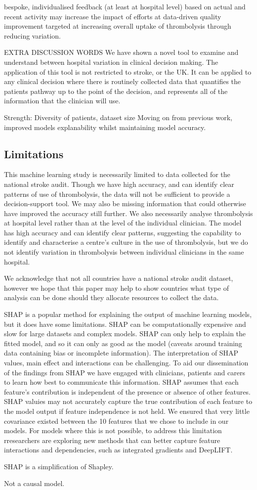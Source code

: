 bespoke, individualised feedback (at least at hospital level) based on actual and recent activity may increase the impact of efforts at data-driven quality improvement targeted at increasing overall uptake of thrombolysis through reducing variation.

EXTRA DISCUSSION WORDS
We have shown a novel tool to examine and understand between hospital variation in clinical decision making. The application of this tool is not restricted to stroke, or the UK. It can be applied to any clinical decision where there is routinely collected data that quantifies the patients pathway up to the point of the decision, and represents all of the information that the clinician will use.

Strength: Diversity of patients, dataset size
Moving on from previous work, improved models explanability whilst maintaining model accuracy.

\subsection{Limitations}

This machine learning study is necessarily limited to data collected for the national stroke audit. Though we have high accuracy, and can identify clear patterns of use of thrombolysis, the data will not be sufficient to provide a decision-support tool. We may also be missing information that could otherwise have improved the accuracy still further. We also necessarily analyse thrombolysis at hospital level rather than at the level of the individual clinician. The model has high accuracy and can identify clear patterns, suggesting the capability to identify and characterise a centre's culture in the use of thrombolysis, but we do not identify variation in thrombolysis between individual clinicians in the same hospital.

We acknowledge that not all countries have a national stroke audit dataset, however we hope that this paper may help to show countries what type of analysis can be done should they allocate resources to collect the data.

SHAP is a popular method for explaining the output of machine learning models, but it does have some limitations. SHAP can be computationally expensive and slow for large datasets and complex models. SHAP can only help to explain the fitted model, and so it can only as good as the model (caveats around training data containing bias or incomplete information). The interpretation of SHAP values, main effect and interactions can be challenging. To aid our dissemination of the findings from SHAP we have engaged with clinicians, patients and carers to learn how best to communicate this information. SHAP assumes that each feature's contribution is independent of the presence or absence of other features. SHAP valuies may not accurately capture the true contribution of each feature to the model output if feature independence is not held. We ensured that very little covariance existed between the 10 features that we chose to include in our models. For models where this is not possible, to address this limitation rresearchers are exploring new methods that can better capture feature interactions and dependencies, such as integrated gradients and DeepLIFT.

SHAP is a simplification of Shapley.

Not a causal model.